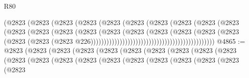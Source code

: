 \begin{lexlean}{R80}
\begin{coremodule}
                                                    (@2823
                                                      (@2823
                                                        (@2823
                                                          (@2823
                                                            (@2823
                                                              (@2823
                                                                (@2823
                                                                  (@2823
                                                                    (@2823
                                                                      (@2823
                                                                        (@2823
                                                                          (@2823
                                                                            (@2823
                                                                              (@2823
                                                                                (@2823
                                                                                  (@2823
                                                                                    (@2823
                                                                                      (@2823
                                                                                        (@2823
                                                                                          (@2823
                                                                                            (@2823
                                                                                              (@2823
                                                                                                (@2823
                                                                                                  @226)))))))))))))))))))))))))))))))))))))))))))))))
@4865 := @2823
    (@2823
      (@2823
        (@2823
          (@2823
            (@2823
              (@2823
                (@2823
                  (@2823
                    (@2823
                      (@2823
                        (@2823
                          (@2823
                            (@2823
                              (@2823
                                (@2823
                                  (@2823
                                    (@2823
                                      (@2823
                                        (@2823
                                          (@2823

\end{coremodule}
\end{lexlean}
